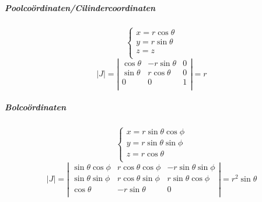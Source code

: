 \subparagraph{Poolcoördinaten/Cilindercoordinaten}
\[
  \left\{
    \begin{array}{l}
      x = r \cos \theta\\
      y = r \sin \theta\\
      z = z\\
    \end{array}
  \right.
\]
\[
  \left| J \right| =
  \left|
    \begin{array}{ccc}
      \cos \theta & - r \sin \theta & 0 \\
      \sin \theta &   r \cos \theta & 0 \\
      0           &   0             & 1 \\
    \end{array}
  \right| = r
\]

\subparagraph{Bolcoördinaten}
\[
  \left\{
    \begin{array}{l}
      x = r \sin \theta \cos \phi\\
      y = r \sin \theta \sin \phi\\
      z = r \cos \theta \\
    \end{array}
  \right.
\]
\[
  \left| J \right| =
  \left|
    \begin{array}{ccc}
      \sin \theta \cos \phi & r \cos \theta \cos \phi & - r \sin \theta \sin \phi \\
      \sin \theta \sin \phi & r \cos \theta \sin \phi &   r \sin \theta \cos \phi \\
      \cos \theta           & - r \sin \theta         & 0 \\
    \end{array}
  \right| = r^2 \sin \theta
\]